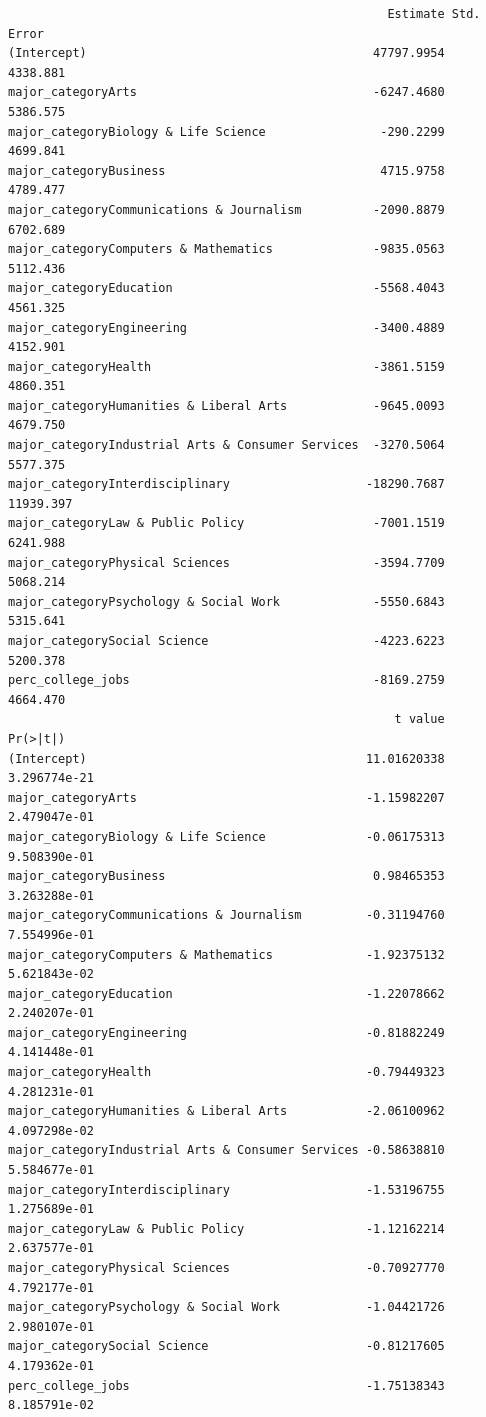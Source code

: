 \documentclass[10pt, twoside, openleft]{article}
\begin{document}
\begin{verbatim}
                                                     Estimate Std. Error
(Intercept)                                        47797.9954   4338.881
major_categoryArts                                 -6247.4680   5386.575
major_categoryBiology & Life Science                -290.2299   4699.841
major_categoryBusiness                              4715.9758   4789.477
major_categoryCommunications & Journalism          -2090.8879   6702.689
major_categoryComputers & Mathematics              -9835.0563   5112.436
major_categoryEducation                            -5568.4043   4561.325
major_categoryEngineering                          -3400.4889   4152.901
major_categoryHealth                               -3861.5159   4860.351
major_categoryHumanities & Liberal Arts            -9645.0093   4679.750
major_categoryIndustrial Arts & Consumer Services  -3270.5064   5577.375
major_categoryInterdisciplinary                   -18290.7687  11939.397
major_categoryLaw & Public Policy                  -7001.1519   6241.988
major_categoryPhysical Sciences                    -3594.7709   5068.214
major_categoryPsychology & Social Work             -5550.6843   5315.641
major_categorySocial Science                       -4223.6223   5200.378
perc_college_jobs                                  -8169.2759   4664.470
                                                      t value     Pr(>|t|)
(Intercept)                                       11.01620338 3.296774e-21
major_categoryArts                                -1.15982207 2.479047e-01
major_categoryBiology & Life Science              -0.06175313 9.508390e-01
major_categoryBusiness                             0.98465353 3.263288e-01
major_categoryCommunications & Journalism         -0.31194760 7.554996e-01
major_categoryComputers & Mathematics             -1.92375132 5.621843e-02
major_categoryEducation                           -1.22078662 2.240207e-01
major_categoryEngineering                         -0.81882249 4.141448e-01
major_categoryHealth                              -0.79449323 4.281231e-01
major_categoryHumanities & Liberal Arts           -2.06100962 4.097298e-02
major_categoryIndustrial Arts & Consumer Services -0.58638810 5.584677e-01
major_categoryInterdisciplinary                   -1.53196755 1.275689e-01
major_categoryLaw & Public Policy                 -1.12162214 2.637577e-01
major_categoryPhysical Sciences                   -0.70927770 4.792177e-01
major_categoryPsychology & Social Work            -1.04421726 2.980107e-01
major_categorySocial Science                      -0.81217605 4.179362e-01
perc_college_jobs                                 -1.75138343 8.185791e-02
\end{verbatim}
\end{document}
